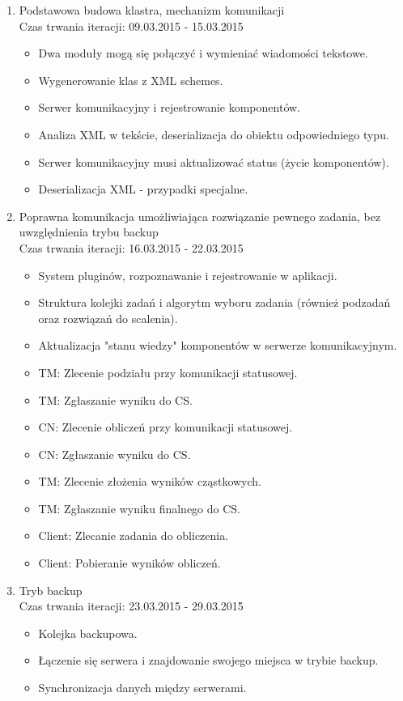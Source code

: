 \documentclass[a4paper]{article}
\begin{document}
	\begin{enumerate}
		\item Podstawowa budowa klastra, mechanizm komunikacji\\
				Czas trwania iteracji: 09.03.2015 - 15.03.2015
		\begin{itemize}
			\item Dwa moduły mogą się połączyć i wymieniać wiadomości tekstowe.
			\item Wygenerowanie klas z XML schemes.
			\item Serwer komunikacyjny i rejestrowanie komponentów.
			\item Analiza XML w tekście, deserializacja do obiektu odpowiedniego typu.
			\item Serwer komunikacyjny musi aktualizować status (życie komponentów).
			\item Deserializacja XML - przypadki specjalne.
		\end{itemize}
		\item Poprawna komunikacja umożliwiająca rozwiązanie pewnego zadania, bez uwzględnienia trybu backup\\
				Czas trwania iteracji: 16.03.2015 - 22.03.2015 
		\begin{itemize}
			\item System pluginów, rozpoznawanie i rejestrowanie w aplikacji.
			\item Struktura kolejki zadań i algorytm wyboru zadania (również podzadań oraz rozwiązań do scalenia).
			\item Aktualizacja "stanu wiedzy" komponentów w serwerze komunikacyjnym.
			\item TM: Zlecenie podziału przy komunikacji statusowej.
			\item TM: Zgłaszanie wyniku do CS.
			\item CN: Zlecenie obliczeń przy komunikacji statusowej.
			\item CN: Zgłaszanie wyniku do CS.
			\item TM: Zlecenie złożenia wyników cząstkowych.
			\item TM: Zgłaszanie wyniku finalnego do CS.
			\item Client: Zlecanie zadania do obliczenia.
			\item Client: Pobieranie wyników obliczeń.
		\end{itemize}
		\item Tryb backup\\
				Czas trwania iteracji: 23.03.2015 - 29.03.2015
		\begin{itemize}
			\item Kolejka backupowa.
			\item Łączenie się serwera i znajdowanie swojego miejsca w trybie backup.
			\item Synchronizacja danych między serwerami.
		\end{itemize}
	\end{enumerate}	 
	
\end{document}
